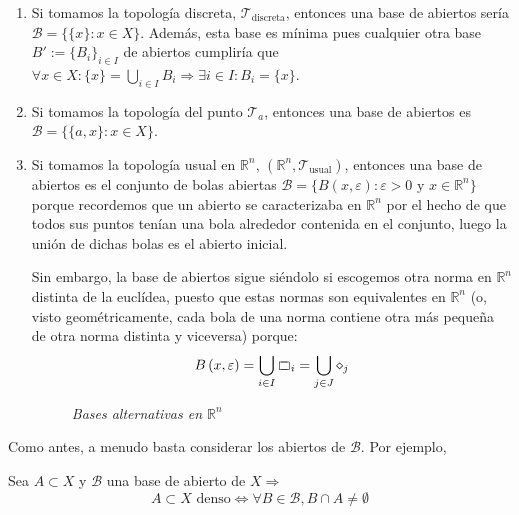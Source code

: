 \begin{ej}
\begin{enumerate}
    \item Si tomamos la topología discreta, $\mathcal{T}_{\text{discreta}}$, entonces una base de abiertos sería $\mathcal{B} = \{\{x\} : x \in X\}$. Además, esta base es mínima pues cualquier otra base $B' := \{B_i\}_{i\in I}$ de abiertos cumpliría que $\forall x \in X : \{x\} = \bigcup_{i \in  I} B_i \Rightarrow \exists i \in I : B_i = \{x\}$.
    \item Si tomamos la topología del punto $\mathcal{T}_a$, entonces una base de abiertos es $\mathcal{B} = \{\{a, x\} : x \in X\}$.
    \item Si tomamos la topología usual en $\mathbb{R}^n$, $\left( \mathbb{R}^n, \mathcal{T}_{\text{usual}} \right)$, entonces una base de abiertos es el conjunto de bolas abiertas $\mathcal{B} = \{B\left( x, \varepsilon \right) : \varepsilon > 0 \mbox{ y } x \in \mathbb{R}^n\}$ porque recordemos que un abierto se caracterizaba en $\mathbb{R}^n$ por el hecho de que todos sus puntos tenían una bola alrededor contenida en el conjunto, luego la unión de dichas bolas es el abierto inicial.

    Sin embargo, la base de abiertos sigue siéndolo si escogemos otra norma en $\mathbb{R}^n$ distinta de la euclídea, puesto que estas normas son equivalentes en $\mathbb{R}^n$ (o, visto geométricamente, cada bola de una norma contiene otra más pequeña de otra norma distinta y viceversa)
    porque:
    \[
    B\left( x, \varepsilon \right) = \bigcup_{i \in  I} \ooalign{$\sqsubset\mkern3mu$\cr$\mkern3mu\sqsupset$\cr}_i = \bigcup_{j \in J} \diamond_j
    \]
\begin{figure}[H]
    \centering
    \caption{\textit{Bases alternativas en $\mathbb{R}^n$}}
    \label{fig:bases-alternativas-en-rn}
\end{figure}
\end{enumerate}
\end{ej}

\begin{obs}
Como antes, a menudo basta considerar los abiertos de $\mathcal{B}$. Por ejemplo,
\end{obs} 
\begin{prop}    
Sea $A \subset X$ y $\mathcal{B}$ una base de abierto de $X \Rightarrow$
\[
A \subset X \text{ denso} \Leftrightarrow \forall B \in \mathcal{B}, B \cap A \neq \emptyset
\]
\end{prop}

